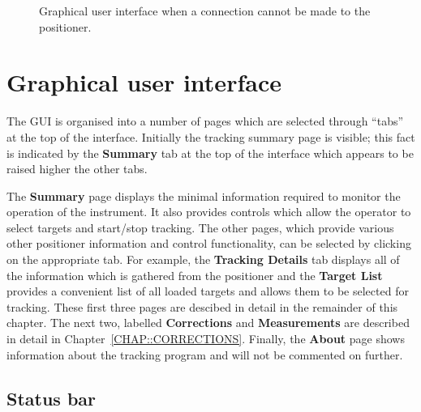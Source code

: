 \documentclass[letterpaper,12pt]{report}
\begin{document}
\begin{figure}[p]
\centerline{}
\caption{\label{FIG::GUI_NOCONNECTION} Graphical user 
interface when a connection cannot be made to the positioner.}
\end{figure}

\section{Graphical user interface}

The GUI is organised into a number of pages which are selected through
``tabs'' at the top of the interface. Initially the tracking summary
page is visible; this fact is indicated by the \textbf{Summary} tab at
the top of the interface which appears to be raised higher the other
tabs. 

The \textbf{Summary} page displays the minimal information required to
monitor the operation of the instrument. It also provides controls
which allow the operator to select targets and start/stop
tracking. The other pages, which provide various other positioner
information and control functionality, can be selected by clicking on
the appropriate tab.  For example, the \textbf{Tracking Details} tab
displays all of the information which is gathered from the positioner
and the \textbf{Target List} provides a convenient list of all loaded
targets and allows them to be selected for tracking. These first three
pages are descibed in detail in the remainder of this chapter.  The
next two, labelled \textbf{Corrections} and \textbf{Measurements} are
described in detail in Chapter~\ref{CHAP::CORRECTIONS}. Finally, the
\textbf{About} page shows information about the tracking program and
will not be commented on further.

\subsection{Status bar}
\end{document}
